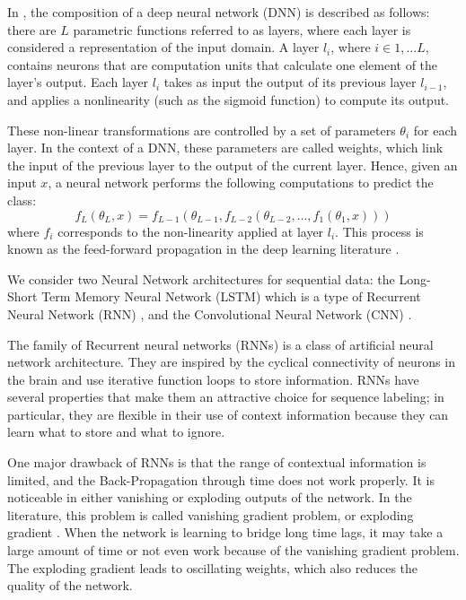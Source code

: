 In \cite{Fawaz2019}, the composition of a deep neural network (DNN) is described as follows: there are $L$ parametric functions referred to as layers, where each layer is considered a representation of the input domain. A layer $l_{i}$, where $i \in 1, \ldots L$, contains neurons that are computation units that calculate one element of the layer's output. Each layer $l_i$ takes as input the output of its previous layer $l_{i-1}$, and applies a nonlinearity (such as the sigmoid function) to compute its output.

These non-linear transformations are controlled by a set of parameters $\theta_{i}$ for each layer. In the context of a DNN, these parameters are called weights, which link the input of the previous layer to the output of the current layer. Hence, given an input $x$, a neural network performs the following computations to predict the class:
\begin{equation}
f_{L}(\theta_{L}, x) = f_{L-1}(\theta_{L-1}, f_{L-2}(\theta_{L-2}, \ldots, f_{1}(\theta_{1},x)))
\end{equation}
where $f_{i}$ corresponds to the non-linearity applied at layer $l_{i}$. This process is known as the feed-forward propagation in the deep learning literature \cite{Goodfellow2016}.

We consider two Neural Network architectures for sequential data: the Long-Short Term Memory Neural Network (LSTM) \cite{HochSchm1997} which is a type of Recurrent Neural Network (RNN) \cite{Rumelhart1986a}, and the Convolutional Neural Network (CNN) \cite{Lecun1989}.

The family of Recurrent neural networks (RNNs) is a class of artificial neural network architecture. They are inspired by the cyclical connectivity of neurons in the brain and use iterative function loops to store information. RNNs have several properties that make them an attractive choice for sequence labeling; in particular, they are flexible in their use of context information because they can learn what to store and what to ignore.

One major drawback of RNNs is that the range of contextual information is limited, and the Back-Propagation through time does not work properly. It is noticeable in either vanishing or exploding outputs of the network. In the literature, this problem is called vanishing gradient problem, or exploding gradient \cite{Glorot2011}. When the network is learning to bridge long time lags, it may take a large amount of time or not even work because of the vanishing gradient problem. The exploding gradient leads to oscillating weights, which also reduces the quality of the network. 

